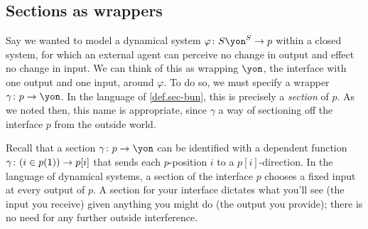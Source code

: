 \documentclass[Book-Poly]{subfiles}
\begin{document}
\subsection{Sections as wrappers}\label{subsec.poly.dyn_sys.new.sit_encl}
Say we wanted to model a dynamical system $\varphi\colon S\yon^S\to p$ within a closed system, for which an external agent can perceive no change in output and effect no change in input.
We can think of this as wrapping $\yon$, the interface with one output and one input, around $\varphi$.
To do so, we must specify a wrapper $\gamma\colon p\to\yon$.
In the language of \cref{def.sec-bun}, this is precisely a \emph{section} of $p$.
As we noted then, this name is appropriate, since $\gamma$ a way of sectioning off the interface $p$ from the outside world.

Recall that a section $\gamma\colon p\to\yon$ can be identified with a dependent function $\gamma\colon(i\in p(\textsf{1}))\to p[i]$ that sends each $p$-position $i$ to a $p[i]$-direction.
In the language of dynamical systems, a section of the interface $p$ chooses a fixed input at every output of $p$.
A section for your interface dictates what you'll see (the input you receive) given anything you might do (the output you provide); there is no need for any further outside interference.
\end{document}
